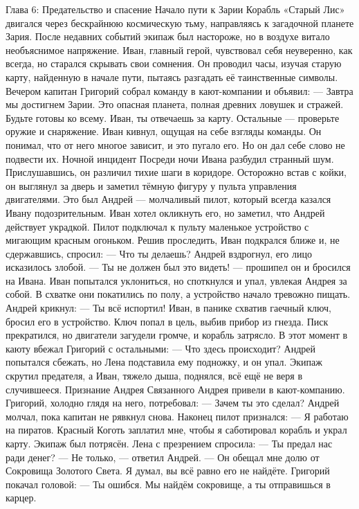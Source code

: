 \documentclass[12pt,a4paper]{book}
\begin{document}
Глава 6: Предательство и спасение
Начало пути к Зарии
Корабль «Старый Лис» двигался через бескрайнюю космическую тьму, направляясь к загадочной планете Зария. После недавних событий экипаж был настороже, но в воздухе витало необъяснимое напряжение. Иван, главный герой, чувствовал себя неуверенно, как всегда, но старался скрывать свои сомнения. Он проводил часы, изучая старую карту, найденную в начале пути, пытаясь разгадать её таинственные символы.
Вечером капитан Григорий собрал команду в кают-компании и объявил:
— Завтра мы достигнем Зарии. Это опасная планета, полная древних ловушек и стражей. Будьте готовы ко всему. Иван, ты отвечаешь за карту. Остальные — проверьте оружие и снаряжение.
Иван кивнул, ощущая на себе взгляды команды. Он понимал, что от него многое зависит, и это пугало его. Но он дал себе слово не подвести их.
Ночной инцидент
Посреди ночи Ивана разбудил странный шум. Прислушавшись, он различил тихие шаги в коридоре. Осторожно встав с койки, он выглянул за дверь и заметил тёмную фигуру у пульта управления двигателями. Это был Андрей — молчаливый пилот, который всегда казался Ивану подозрительным.
Иван хотел окликнуть его, но заметил, что Андрей действует украдкой. Пилот подключал к пульту маленькое устройство с мигающим красным огоньком. Решив проследить, Иван подкрался ближе и, не сдержавшись, спросил:
— Что ты делаешь?
Андрей вздрогнул, его лицо исказилось злобой.
— Ты не должен был это видеть! — прошипел он и бросился на Ивана.
Иван попытался уклониться, но споткнулся и упал, увлекая Андрея за собой. В схватке они покатились по полу, а устройство начало тревожно пищать. Андрей крикнул:
— Ты всё испортил!
Иван, в панике схватив гаечный ключ, бросил его в устройство. Ключ попал в цель, выбив прибор из гнезда. Писк прекратился, но двигатели загудели громче, и корабль затрясло.
В этот момент в каюту вбежал Григорий с остальными:
— Что здесь происходит?
Андрей попытался сбежать, но Лена подставила ему подножку, и он упал. Экипаж скрутил предателя, а Иван, тяжело дыша, поднялся, всё ещё не веря в случившееся.
Признание Андрея
Связанного Андрея привели в кают-компанию. Григорий, холодно глядя на него, потребовал:
— Зачем ты это сделал?
Андрей молчал, пока капитан не рявкнул снова. Наконец пилот признался:
— Я работаю на пиратов. Красный Коготь заплатил мне, чтобы я саботировал корабль и украл карту.
Экипаж был потрясён. Лена с презрением спросила:
— Ты предал нас ради денег?
— Не только, — ответил Андрей. — Он обещал мне долю от Сокровища Золотого Света. Я думал, вы всё равно его не найдёте.
Григорий покачал головой:
— Ты ошибся. Мы найдём сокровище, а ты отправишься в карцер.
\end{document}
